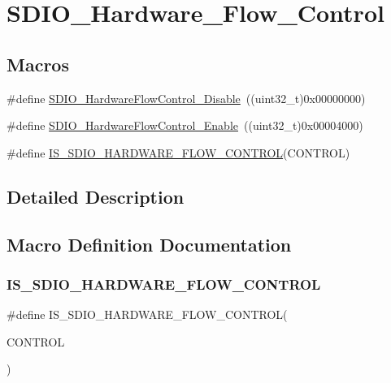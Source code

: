 \hypertarget{group___s_d_i_o___hardware___flow___control}{}\section{S\+D\+I\+O\+\_\+\+Hardware\+\_\+\+Flow\+\_\+\+Control}
\label{group___s_d_i_o___hardware___flow___control}
\subsection*{Macros}
\begin{DoxyCompactItemize}
\item 
\#define \mbox{\hyperlink{group___s_d_i_o___hardware___flow___control_ga7529a3c8a11ac685bde4aafa12c8a977}{S\+D\+I\+O\+\_\+\+Hardware\+Flow\+Control\+\_\+\+Disable}}~((uint32\+\_\+t)0x00000000)
\item 
\#define \mbox{\hyperlink{group___s_d_i_o___hardware___flow___control_gab6cfef6778d829f3dcefc6c2bad7c9aa}{S\+D\+I\+O\+\_\+\+Hardware\+Flow\+Control\+\_\+\+Enable}}~((uint32\+\_\+t)0x00004000)
\item 
\#define \mbox{\hyperlink{group___s_d_i_o___hardware___flow___control_gad8be549f8348479d064dff21343ae411}{I\+S\+\_\+\+S\+D\+I\+O\+\_\+\+H\+A\+R\+D\+W\+A\+R\+E\+\_\+\+F\+L\+O\+W\+\_\+\+C\+O\+N\+T\+R\+OL}}(C\+O\+N\+T\+R\+OL)
\end{DoxyCompactItemize}


\subsection{Detailed Description}


\subsection{Macro Definition Documentation}
\mbox{\label{group___s_d_i_o___hardware___flow___control_gad8be549f8348479d064dff21343ae411}} 
\subsubsection{\texorpdfstring{IS\_SDIO\_HARDWARE\_FLOW\_CONTROL}{IS\_SDIO\_HARDWARE\_FLOW\_CONTROL}}
{\footnotesize\ttfamily \#define I\+S\+\_\+\+S\+D\+I\+O\+\_\+\+H\+A\+R\+D\+W\+A\+R\+E\+\_\+\+F\+L\+O\+W\+\_\+\+C\+O\+N\+T\+R\+OL(\begin{DoxyParamCaption}\item[{}]{C\+O\+N\+T\+R\+OL }\end{DoxyParamCaption})}

